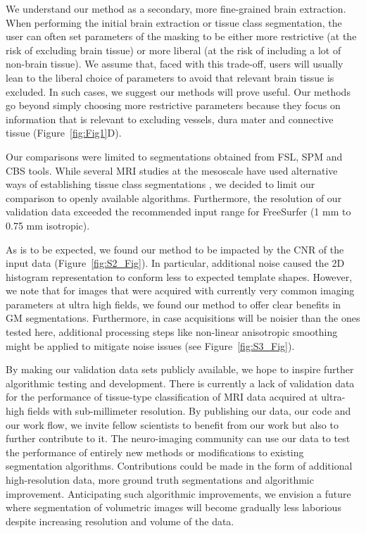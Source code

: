 We understand our method as a secondary, more fine-grained brain extraction. When performing the initial brain extraction or tissue class segmentation, the user can often set parameters of the masking to be either more restrictive (at the risk of excluding brain tissue) or more liberal (at the risk of including a lot of non-brain tissue). We assume that, faced with this trade-off, users will usually lean to the liberal choice of parameters to avoid that relevant brain tissue is excluded. In such cases, we suggest our methods will prove useful. Our methods go beyond simply choosing more restrictive parameters because they focus on information that is relevant to excluding vessels, dura mater and connective tissue (Figure~\ref{fig:Fig1}D).

Our comparisons were limited to segmentations obtained from FSL, SPM and CBS tools. While several MRI studies at the mesoscale have used alternative ways of establishing tissue class segmentations \parencite{Fischl2004, Goebel2006}, we decided to limit our comparison to openly available algorithms. Furthermore, the resolution of our validation data exceeded the recommended input range for FreeSurfer (1 mm to 0.75 mm isotropic).

As is to be expected, we found our method to be impacted by the CNR of the input data (Figure~\ref{fig:S2_Fig}). In particular, additional noise caused the 2D histogram representation to conform less to expected template shapes. However, we note that for images that were acquired with currently very common imaging parameters at ultra high fields, we found our method to offer clear benefits in GM segmentations. Furthermore, in case acquisitions will be noisier than the ones tested here, additional processing steps like non-linear anisotropic smoothing \parencite{Weickert1998, Mirebeau2015} might be applied to mitigate noise issues (see Figure~\ref{fig:S3_Fig}).

By making our validation data sets publicly available, we hope to inspire further algorithmic testing and development. There is currently a lack of validation data for the performance of tissue-type classification of MRI data acquired at ultra-high fields with sub-millimeter resolution. By publishing our data, our code and our work flow, we invite fellow scientists to benefit from our work but also to further contribute to it. The neuro-imaging community can use our data to test the performance of entirely new methods or modifications to existing segmentation algorithms. Contributions could be made in the form of additional high-resolution data, more ground truth segmentations and algorithmic improvement. Anticipating such algorithmic improvements, we envision a future where segmentation of volumetric images will become gradually less laborious despite increasing resolution and volume of the data.


